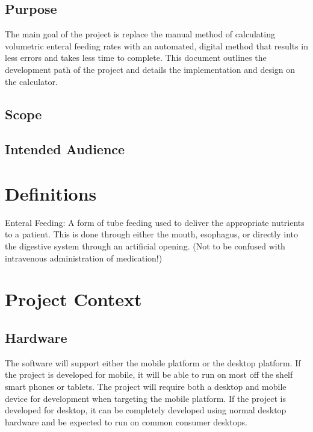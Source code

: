 \documentclass[onecolumn, draftclsnofoot,10pt, compsoc]{IEEEtran}
\begin{document}
\subsection{Purpose}
The main goal of the project is replace the manual method of calculating volumetric enteral feeding rates with an automated, digital method that results in less errors and takes less time to complete. This document outlines the development path of the project and details the implementation and design on the calculator.
\subsection{Scope}
\subsection{Intended Audience}

\section{Definitions}
Enteral Feeding: A form of tube feeding used to deliver the appropriate nutrients to a patient. This is done through either the mouth, esophagus, or directly into the digestive system through an artificial opening. (Not to be confused with intravenous administration of medication!)
\newline
\newline

\section{Project Context}
\subsection{Hardware}
The software will support either the mobile platform or the desktop platform.
If the project is developed for mobile, it will be able to run on most off the shelf smart phones or tablets.
The project will require both a desktop and mobile device for development when targeting the mobile platform.
If the project is developed for desktop, it can be completely developed using normal desktop hardware and be expected to run on common consumer desktops.
\end{document}
